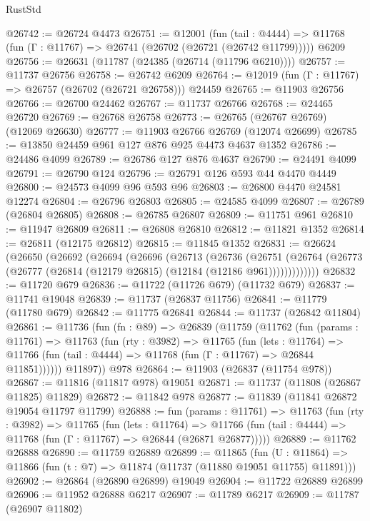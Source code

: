 \begin{lexlean}{RustStd}
\begin{coremodule}
@26742 := @26724 @4473
@26751 := @12001
    (fun (tail : @4444) => @11768 (fun (Γ : @11767) => @26741 (@26702 (@26721 (@26742 @11799)))))
    @6209
@26756 := @26631 (@11787 (@24385 (@26714 (@11796 @6210))))
@26757 := @11737 @26756
@26758 := @26742 @6209
@26764 := @12019 (fun (Γ : @11767) => @26757 (@26702 (@26721 @26758))) @24459
@26765 := @11903 @26756
@26766 := @26700 @24462
@26767 := @11737 @26766
@26768 := @24465 @26720
@26769 := @26768 @26758
@26773 := @26765 (@26767 @26769) (@12069 @26630)
@26777 := @11903 @26766 @26769 (@12074 @26699)
@26785 := @13850 @24459 @961 @127 @876 @925 @4473 @4637 @1352
@26786 := @24486 @4099
@26789 := @26786 @127 @876 @4637
@26790 := @24491 @4099
@26791 := @26790 @124
@26796 := @26791 @126 @593 @44 @4470 @4449
@26800 := @24573 @4099 @96 @593 @96
@26803 := @26800 @4470 @24581 @12274
@26804 := @26796 @26803
@26805 := @24585 @4099
@26807 := @26789 (@26804 @26805)
@26808 := @26785 @26807
@26809 := @11751 @961
@26810 := @11947 @26809
@26811 := @26808 @26810
@26812 := @11821 @1352
@26814 := @26811 (@12175 @26812)
@26815 := @11845 @1352
@26831 := @26624
    (@26650
      (@26692
        (@26694
          (@26696
            (@26713
              (@26736
                (@26751
                  (@26764 (@26773 (@26777 (@26814 (@12179 @26815) (@12184 (@12186 @961)))))))))))))
@26832 := @11720 @679
@26836 := @11722 (@11726 @679) (@11732 @679)
@26837 := @11741 @19048
@26839 := @11737 (@26837 @11756)
@26841 := @11779 (@11780 @679)
@26842 := @11775 @26841
@26844 := @11737 (@26842 @11804)
@26861 := @11736
    (fun (fn : @89) =>
    @26839
      (@11759
        (@11762
          (fun (params : @11761) =>
          @11763
            (fun (rty : @3982) =>
            @11765
              (fun (lets : @11764) =>
              @11766 (fun (tail : @4444) => @11768 (fun (Γ : @11767) => @26844 @11851))))))
        @11897))
    @978
@26864 := @11903 (@26837 (@11754 @978))
@26867 := @11816 (@11817 @978) @19051
@26871 := @11737 (@11808 (@26867 @11825) @11829)
@26872 := @11842 @978
@26877 := @11839 (@11841 @26872 @19054 @11797 @11799)
@26888 := fun (params : @11761) =>
  @11763
    (fun (rty : @3982) =>
    @11765
      (fun (lets : @11764) =>
      @11766 (fun (tail : @4444) => @11768 (fun (Γ : @11767) => @26844 (@26871 @26877)))))
@26889 := @11762 @26888
@26890 := @11759 @26889
@26899 := @11865
    (fun (U : @11864) => @11866 (fun (t : @7) => @11874 (@11737 (@11880 @19051 @11755) @11891)))
@26902 := @26864 (@26890 @26899) @19049
@26904 := @11722 @26889 @26899
@26906 := @11952 @26888 @6217
@26907 := @11789 @6217
@26909 := @11787 (@26907 @11802)

\end{coremodule}
\end{lexlean}
